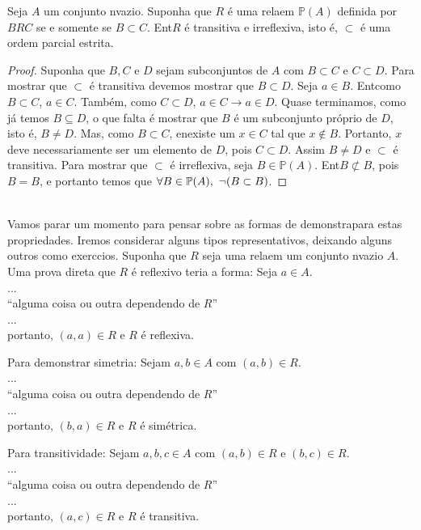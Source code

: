 \begin{teob}
Seja $A$ um conjunto n\ao vazio. Suponha que $R$ \'e uma rela\cao em $\mathbb{P}(A)$ definida por $BRC$ se e somente se $B\subset C$. Ent\ao $R$ \'e transitiva e irreflexiva, isto \'e, $\subset$ \'e uma ordem parcial estrita.
\end{teob}
\begin{proof}
Suponha que $B,C$ e $D$ sejam subconjuntos de $A$ com $B\subset C$ e $C\subset D$. Para mostrar que $\subset$ \'e transitiva devemos mostrar que $B\subset D$.  Seja $a\in B$. Ent\ao como $B\subset C$, $a\in C$.  Tamb\'em, como $C\subset D$, $a\in C\to a\in D$. Quase terminamos, como j\'a temos $B\subseteq D$, o que falta \'e mostrar que $B$ \'e um subconjunto pr\'oprio de $D$, isto \'e, $B\neq D$. Mas, como $B\subset C$, en\tao existe um $x\in C$ tal que $x\notin B$. Portanto, $x$ deve necessariamente ser um elemento de $D$, pois $C\subset D$. Assim $B\neq D$ e $\subset$ \'e transitiva. Para mostrar que $\subset$ \'e irreflexiva, seja $B\in \mathbb{P}(A)$. Ent\ao $B\not\subset B$, pois $B=B$, e portanto temos que $\forall B\in \mathbb{P}(A),\textrm{ }\lnot(B\subset B)$.
\end{proof}
\\

Vamos parar um momento para pensar sobre as formas de demonstra\cao para estas propriedades. Iremos considerar alguns tipos representativos, deixando alguns outros como exerc\ih cios. Suponha que $R$ seja uma rela\cao em um conjunto n\ao vazio $A$. Uma prova direta que $R$ \'e reflexivo teria a forma: Seja $a\in A$.
\\
...
\\ 
``alguma coisa ou outra dependendo de $R$''
\\
...
\\
portanto, $(a,a)\in R$ e $R$ \'e reflexiva.

Para demonstrar simetria: Sejam $a,b\in A$ com $(a,b)\in R$.
\\
...
\\ 
``alguma coisa ou outra dependendo de $R$''
\\
...
\\
portanto, $(b,a)\in R$ e $R$ \'e sim\'etrica.

Para transitividade: Sejam $a,b,c\in A$ com $(a,b)\in R$ e $(b,c)\in R$.
\\
...
\\ 
``alguma coisa ou outra dependendo de $R$''
\\
...
\\
portanto, $(a,c)\in R$ e $R$ \'e transitiva.

